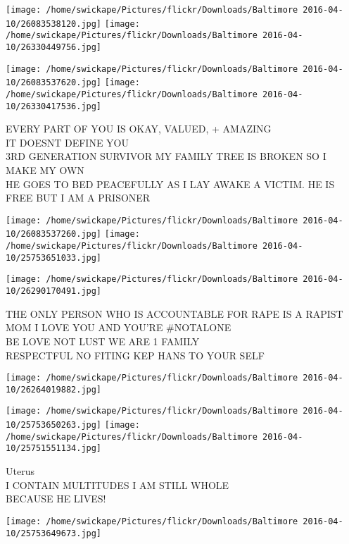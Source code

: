 \documentclass[10pt,letterpaper]{article}
\begin{document}
\texttt{[image: /home/swickape/Pictures/flickr/Downloads/Baltimore 2016-04-10/26083538120.jpg]}
\texttt{[image: /home/swickape/Pictures/flickr/Downloads/Baltimore 2016-04-10/26330449756.jpg]}

\texttt{[image: /home/swickape/Pictures/flickr/Downloads/Baltimore 2016-04-10/26083537620.jpg]}
\texttt{[image: /home/swickape/Pictures/flickr/Downloads/Baltimore 2016-04-10/26330417536.jpg]}

EVERY PART OF YOU IS OKAY, VALUED, + AMAZING\\
IT DOESNT DEFINE YOU\\
3RD GENERATION SURVIVOR MY FAMILY TREE IS BROKEN SO I MAKE MY OWN\\
HE GOES TO BED PEACEFULLY AS I LAY AWAKE A VICTIM.  HE IS FREE BUT I AM A PRISONER\\
\pagebreak

\texttt{[image: /home/swickape/Pictures/flickr/Downloads/Baltimore 2016-04-10/26083537260.jpg]}
\texttt{[image: /home/swickape/Pictures/flickr/Downloads/Baltimore 2016-04-10/25753651033.jpg]}

\texttt{[image: /home/swickape/Pictures/flickr/Downloads/Baltimore 2016-04-10/26290170491.jpg]}

THE ONLY PERSON WHO IS ACCOUNTABLE FOR RAPE IS A RAPIST MOM I LOVE YOU AND YOU'RE \#NOTALONE\\
BE LOVE NOT LUST WE ARE 1 FAMILY\\
RESPECTFUL NO FITING KEP HANS TO YOUR SELF\\
\pagebreak

\texttt{[image: /home/swickape/Pictures/flickr/Downloads/Baltimore 2016-04-10/26264019882.jpg]}

\vspace{0.25in}
\texttt{[image: /home/swickape/Pictures/flickr/Downloads/Baltimore 2016-04-10/25753650263.jpg]}
\texttt{[image: /home/swickape/Pictures/flickr/Downloads/Baltimore 2016-04-10/25751551134.jpg]}

Uterus\\
I CONTAIN MULTITUDES I AM STILL WHOLE\\
BECAUSE HE LIVES!\\
\pagebreak

\texttt{[image: /home/swickape/Pictures/flickr/Downloads/Baltimore 2016-04-10/25753649673.jpg]}
\end{document}

